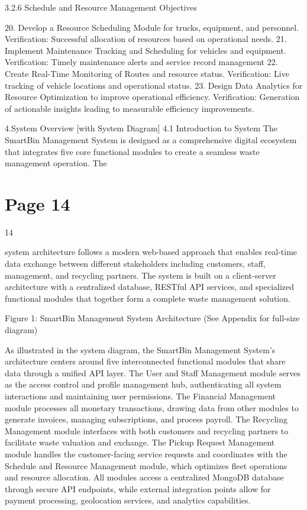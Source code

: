 \documentclass{article}
\begin{document}
    3.2.6 Schedule and Resource Management Objectives 
  
20. Develop a Resource Scheduling Module for trucks, equipment, and personnel. 
       Verification: Successful allocation of resources based on operational needs. 
21. Implement Maintenance Tracking and Scheduling for vehicles and equipment. 
       Verification: Timely maintenance alerts and service record management 
22. Create Real-Time Monitoring of Routes and resource status. 
       Verification: Live tracking of vehicle locations and operational status. 
23. Design Data Analytics for Resource Optimization to improve operational efficiency. 
Verification: Generation of actionable insights leading to measurable efficiency 
improvements. 
 
 
4.System Overview [with System Diagram] 
4.1 Introduction to System  
The SmartBin Management System is designed as a comprehensive digital ecosystem that 
integrates five core functional modules to create a seamless waste management operation. The 

\section*{Page 14}
   
 
 14  
 
system architecture follows a modern web-based approach that enables real-time data 
exchange between different stakeholders including customers, staff, management, and 
recycling partners. The system is built on a client-server architecture with a centralized 
database, RESTful API services, and specialized functional modules that together form a 
complete waste management solution. 
 
  
 
  Figure 1: SmartBin Management System Architecture (See Appendix for full-size diagram) 
 
As illustrated in the system diagram, the SmartBin Management System's architecture centers 
around five interconnected functional modules that share data through a unified API layer. The 
User and Staff Management module serves as the access control and profile management hub, 
authenticating all system interactions and maintaining user permissions. The Financial 
Management module processes all monetary transactions, drawing data from other modules to 
generate invoices, managing subscriptions, and process payroll. The Recycling Management 
module interfaces with both customers and recycling partners to facilitate waste valuation and 
exchange. The Pickup Request Management module handles the customer-facing service 
requests and coordinates with the Schedule and Resource Management module, which 
optimizes fleet operations and resource allocation. All modules access a centralized MongoDB 
database through secure API endpoints, while external integration points allow for payment 
processing, geolocation services, and analytics capabilities. 
 
\end{document}
